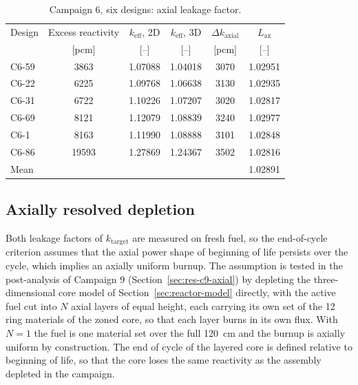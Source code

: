 \begin{table}[htbp]
  \centering
  \small
  \caption{Campaign 6, six designs: axial leakage factor.}
  \label{tab:c6-lax}
  \begin{tabular}{@{}lccccc@{}}
    \toprule
    Design & Excess reactivity & $k_\mathrm{eff}$, 2D & $k_\mathrm{eff}$, 3D &
      $\Delta k_\mathrm{axial}$ & $L_\mathrm{ax}$ \\
     & [pcm] & [--] & [--] & [pcm] & [--] \\
    \midrule
    C6-59 & \num{3863}  & 1.07088 & 1.04018 & 3070 & 1.02951 \\
    C6-22 & \num{6225}  & 1.09768 & 1.06638 & 3130 & 1.02935 \\
    C6-31 & \num{6722}  & 1.10226 & 1.07207 & 3020 & 1.02817 \\
    C6-69 & \num{8121}  & 1.12079 & 1.08839 & 3240 & 1.02977 \\
    C6-1  & \num{8163}  & 1.11990 & 1.08888 & 3101 & 1.02848 \\
    C6-86 & \num{19593} & 1.27869 & 1.24367 & 3502 & 1.02816 \\
    \midrule
    Mean  &              &         &         &      & 1.02891 \\
    \bottomrule
  \end{tabular}
\end{table}

\subsection{Axially resolved depletion}
\label{sec:meth-axial-dep}

Both leakage factors of $k_\mathrm{target}$ are measured on fresh fuel,
so the end-of-cycle criterion assumes that the axial power shape of
beginning of life persists over the cycle, which implies an axially
uniform burnup. The assumption is tested in the
post-analysis of Campaign 9 (Section~\ref{sec:res-c9-axial}) by
depleting the three-dimensional core model of
Section~\ref{sec:reactor-model} directly, with the active fuel cut into
$N$ axial layers of equal height, each carrying its own set of the 12 ring materials of the zoned core, so
that each layer burns in its own flux. With $N = 1$ the fuel is one material set over the full
\SI{120}{cm} and the burnup is axially uniform by construction. The end
of cycle of the layered core is defined relative to beginning of life,
so that the core loses the same reactivity as the assembly depleted in
the campaign.

